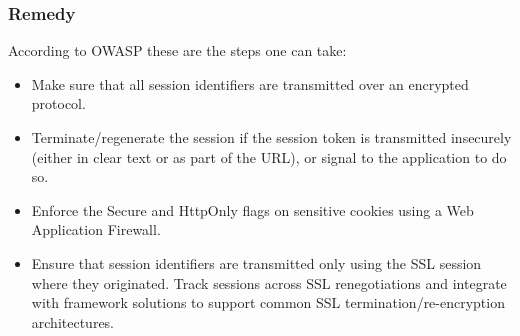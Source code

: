 \subsubsection{Remedy}

According to OWASP\cite{OWASP} these are the steps one can take:
\begin{itemize}
    \item Make sure that all session identifiers are transmitted over an encrypted protocol.
    \item Terminate/regenerate the session if the session token is transmitted insecurely (either in clear text or as part of the URL), or signal to the application to do so.
    \item Enforce the Secure and HttpOnly flags on sensitive cookies using a Web Application Firewall.
    \item Ensure that session identifiers are transmitted only using the SSL session where they originated. Track sessions across SSL renegotiations and integrate with framework solutions to support common SSL termination/re-encryption architectures.
\end{itemize}